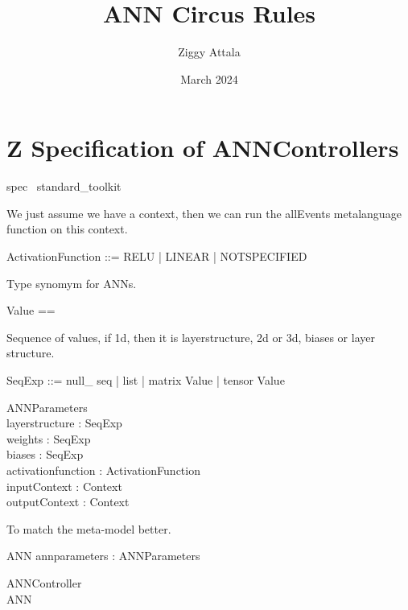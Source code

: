 \documentclass{article}
\title{ANN Circus Rules}
\author{Ziggy Attala}
\date{March 2024}
\begin{document}
\maketitle

\section{Z Specification of ANNControllers}

\begin{zsection}	 \SECTION spec \parents~standard\_toolkit
\end{zsection}


We just assume we have a context, then we can run the allEvents metalanguage function on this context. 
\begin{zed}[ Context ]
\end{zed}

\begin{zed}ActivationFunction ::= RELU | LINEAR | NOTSPECIFIED
\end{zed}


Type synomym for ANNs. 
\begin{zed}
Value == \arithmos
\end{zed}

Sequence of values, if 1d, then it is layerstructure, 2d or 3d, biases or layer structure. 
\begin{zed}
SeqExp ::= null\_ seq | list \ldata \seq \nat \rdata | matrix \ldata \seq \seq Value \rdata | tensor \ldata \seq \seq \seq Value \rdata
\end{zed}


\begin{schema}{ANNParameters}
\\
 layerstructure : SeqExp \\
 weights : SeqExp \\
 biases : SeqExp \\
 activationfunction : ActivationFunction \\
 inputContext : Context \\
 outputContext : Context \\
\end{schema}

To match the meta-model better. 
\begin{schema}{ANN} 
   annparameters : ANNParameters
\end{schema} 

\begin{schema}{ANNController}
\\
ANN
\end{schema}
\end{document}
